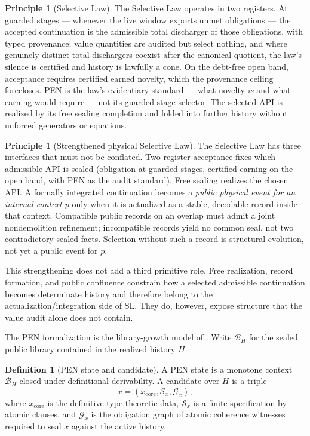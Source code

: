 \documentclass[11pt]{article}
\theoremstyle{plain}
\theoremstyle{definition}
\newtheorem{definition}[theorem]{Definition}
\newtheorem{principle}[theorem]{Principle}
\theoremstyle{remark}
\newcommand{\SLaw}{\mathrm{SL}}
\newcommand{\B}{\mathcal{B}}
\begin{document}
\begin{principle}[Selective Law]
The Selective Law operates in two registers. At guarded stages --- whenever the live window exports unmet obligations --- the accepted continuation is the admissible total discharger of those obligations, with typed provenance; value quantities are audited but select nothing, and where genuinely distinct total dischargers coexist after the canonical quotient, the law's silence is certified and history is lawfully a cone. On the debt-free open band, acceptance requires certified earned novelty, which the provenance ceiling forecloses. PEN is the law's evidentiary standard --- what novelty \emph{is} and what earning would require --- not its guarded-stage selector. The selected API is realized by its free sealing completion and folded into further history without unforced generators or equations.
\end{principle}

\begin{principle}[Strengthened physical Selective Law]
The Selective Law has three interfaces that must not be conflated. Two-register acceptance fixes which admissible API is sealed (obligation at guarded stages, certified earning on the open band, with PEN as the audit standard). Free sealing realizes the chosen API. A formally integrated continuation becomes a \emph{public physical event for an internal context \(p\)} only when it is actualized as a stable, decodable record inside that context. Compatible public records on an overlap must admit a joint nondemolition refinement; incompatible records yield no common seal, not two contradictory sealed facts. Selection without such a record is structural evolution, not yet a public event for \(p\).
\end{principle}

This strengthening does not add a third primitive role. Free realization, record formation, and public confluence constrain how a selected admissible continuation becomes determinate history and therefore belong to the actualization/integration side of \(\SLaw\). They do, however, expose structure that the value audit alone does not contain.

\noindent The PEN formalization is the library-growth model of \cite{lande-pen}. Write \(\B_H\) for the sealed public library contained in the realized history \(H\).

\begin{definition}[PEN state and candidate]
A PEN state is a monotone context \(\B_H\) closed under definitional derivability. A candidate over \(H\) is a triple
\[
x=(x_{\mathrm{core}},\mathcal{S}_x,\mathcal{G}_x),
\]
where \(x_{\mathrm{core}}\) is the definitive type-theoretic data, \(\mathcal{S}_x\) is a finite specification by atomic clauses, and \(\mathcal{G}_x\) is the obligation graph of atomic coherence witnesses required to seal \(x\) against the active history.
\end{definition}
\end{document}
